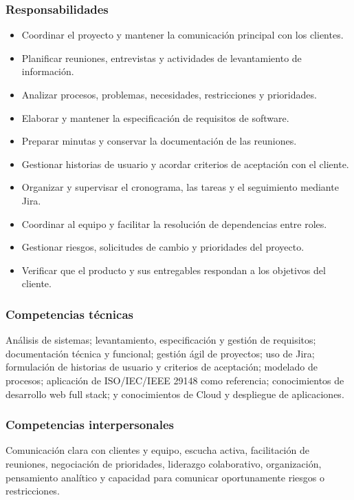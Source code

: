 \subsubsection{Responsabilidades}
\begin{itemize}
  \item Coordinar el proyecto y mantener la comunicación principal con los clientes.
  \item Planificar reuniones, entrevistas y actividades de levantamiento de información.
  \item Analizar procesos, problemas, necesidades, restricciones y prioridades.
  \item Elaborar y mantener la especificación de requisitos de software.
  \item Preparar minutas y conservar la documentación de las reuniones.
  \item Gestionar historias de usuario y acordar criterios de aceptación con el cliente.
  \item Organizar y supervisar el cronograma, las tareas y el seguimiento mediante Jira.
  \item Coordinar al equipo y facilitar la resolución de dependencias entre roles.
  \item Gestionar riesgos, solicitudes de cambio y prioridades del proyecto.
  \item Verificar que el producto y sus entregables respondan a los objetivos del cliente.
\end{itemize}

\subsubsection{Competencias técnicas}

Análisis de sistemas; levantamiento, especificación y gestión de requisitos;
documentación técnica y funcional; gestión ágil de proyectos; uso de Jira;
formulación de historias de usuario y criterios de aceptación; modelado de
procesos; aplicación de ISO/IEC/IEEE 29148 como referencia; conocimientos de
desarrollo web full stack; y conocimientos de Cloud y despliegue de aplicaciones.

\subsubsection{Competencias interpersonales}

Comunicación clara con clientes y equipo, escucha activa, facilitación de
reuniones, negociación de prioridades, liderazgo colaborativo, organización,
pensamiento analítico y capacidad para comunicar oportunamente riesgos o
restricciones.

